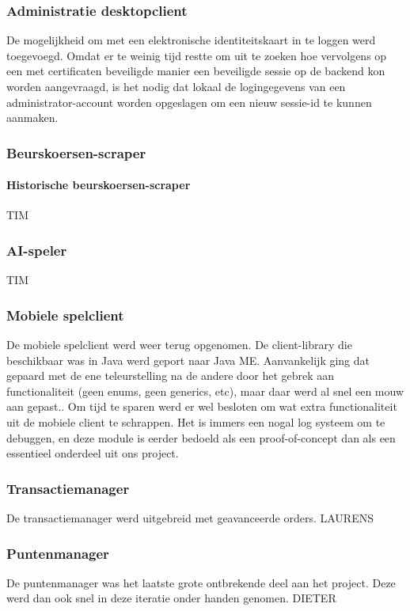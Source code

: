 \subsubsection{Administratie desktopclient}
De mogelijkheid om met een elektronische identiteitskaart in te loggen werd toegevoegd. Omdat er te weinig tijd restte om uit te zoeken hoe vervolgens op een met certificaten beveiligde manier een beveiligde sessie op de backend kon worden aangevraagd, is het nodig dat lokaal de logingegevens van een administrator-account worden opgeslagen om een nieuw sessie-id te kunnen aanmaken.

\subsubsection{Beurskoersen-scraper}
\paragraph{Historische beurskoersen-scraper}
\todo TIM
\subsubsection{AI-speler}
\todo TIM

\subsubsection{Mobiele spelclient}
De mobiele spelclient werd weer terug opgenomen. De client-library die beschikbaar was in Java werd geport naar Java ME. Aanvankelijk ging dat gepaard met de ene teleurstelling na de andere door het gebrek aan functionaliteit (geen enums, geen generics, etc), maar daar werd al snel een mouw aan gepast.. Om tijd  te sparen werd er wel besloten om wat extra functionaliteit uit de mobiele client te schrappen. Het is immers een nogal log systeem om te debuggen, en deze module is eerder bedoeld als een proof-of-concept dan als een essentieel onderdeel uit ons project.

\subsubsection{Transactiemanager}
De transactiemanager werd uitgebreid met geavanceerde orders.
\todo LAURENS

\subsubsection{Puntenmanager}
De puntenmanager was het laatste grote ontbrekende deel aan het project. Deze werd dan ook snel in deze iteratie onder handen genomen.
\todo DIETER

